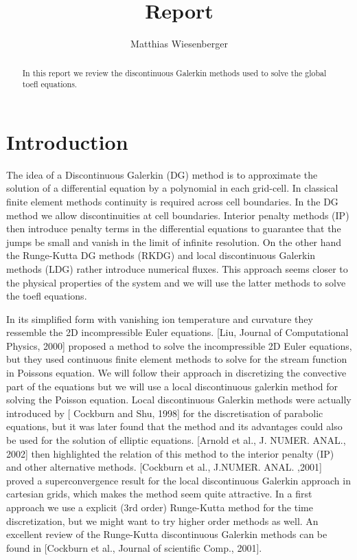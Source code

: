 \documentclass[a4paper,12pt]{scrartcl}
\title{Report}
\author{Matthias  Wiesenberger}
\begin{document}
\maketitle

\begin{abstract}
    In this report we review the discontinuous Galerkin methods used to solve the global toefl equations. 
\end{abstract}

\section{Introduction}
The idea of a Discontinuous Galerkin (DG) method is to approximate the solution 
of a differential equation by a polynomial in each grid-cell. 
In classical finite element methods continuity is required across cell boundaries. 
In the DG method we allow discontinuities at cell boundaries. Interior penalty 
methods (IP) then introduce penalty terms in the differential equations 
to guarantee that the jumps be small and vanish in the limit of infinite 
resolution. On the other hand the Runge-Kutta DG methods (RKDG) and local 
discontinuous Galerkin methods (LDG) rather introduce numerical fluxes. This
approach seems closer to the physical properties of the system and we 
will use the latter methods to solve the toefl equations.

In its simplified form with vanishing ion temperature and curvature they 
ressemble the 2D incompressible Euler equations. 
[Liu, Journal of Computational Physics, 2000] proposed a method to solve the 
incompressible 2D Euler equations, but they used continuous finite element methods
to solve for the stream function in Poissons equation. We will follow their approach
in discretizing the convective part of the equations but we will use a local 
discontinuous galerkin method for solving the Poisson equation. 
Local discontinuous Galerkin methods were actually introduced by [ Cockburn and Shu, 1998] for the discretisation of parabolic equations, but
it was later found that the method and its advantages could also be used for the solution of elliptic 
equations. 
[Arnold et al., J. NUMER. ANAL., 2002] then highlighted the relation of this method to the interior penalty (IP) and other alternative methods. 
[Cockburn et al., J.NUMER. ANAL. ,2001] proved a superconvergence result for the local discontinuous Galerkin approach in cartesian grids, which makes the method seem 
quite attractive. 
In a first approach we use a explicit (3rd order) Runge-Kutta method for the time discretization, but we might want to try higher order methods as well.   
An excellent review of the Runge-Kutta discontinuous Galerkin methods can be found in [Cockburn et al., Journal of scientific Comp., 2001]. 
\end{document}
